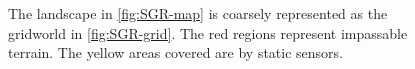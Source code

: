 \begin{figure}
\centering
{}\hspace{1cm}
{}

\caption{The landscape in \ref{fig:SGR-map} is coarsely represented as the gridworld in \ref{fig:SGR-grid}. The red regions represent impassable terrain. The yellow areas covered are by static sensors.}\vspace{-0.5cm}
\label{fig:casestudy}
\end{figure}

